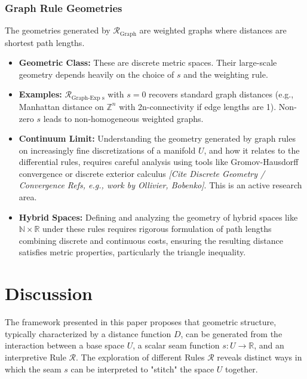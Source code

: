 \documentclass[twoside,twocolumn]{article}
\begin{document}
\subsubsection{Graph Rule Geometries}
The geometries generated by \( \mathcal{R}_{\text{Graph}} \) are weighted graphs where distances are shortest path lengths.
\begin{itemize}
    \item \textbf{Geometric Class:} These are discrete metric spaces. Their large-scale geometry depends heavily on the choice of \( s \) and the weighting rule.
    \item \textbf{Examples:} \( \mathcal{R}_{\text{Graph-Exp s}} \) with \( s=0 \) recovers standard graph distances (e.g., Manhattan distance on \( \mathbb{Z}^n \) with 2n-connectivity if edge lengths are 1). Non-zero \( s \) leads to non-homogeneous weighted graphs.
    \item \textbf{Continuum Limit:} Understanding the geometry generated by graph rules on increasingly fine discretizations of a manifold \( U \), and how it relates to the differential rules, requires careful analysis using tools like Gromov-Hausdorff convergence or discrete exterior calculus \textit{[Cite Discrete Geometry / Convergence Refs, e.g., work by Ollivier, Bobenko]}. This is an active research area.
    \item \textbf{Hybrid Spaces:} Defining and analyzing the geometry of hybrid spaces like \( \mathbb{N} \times \mathbb{R} \) under these rules requires rigorous formulation of path lengths combining discrete and continuous costs, ensuring the resulting distance satisfies metric properties, particularly the triangle inequality.
\end{itemize}


\setcounter{equation}{0}
\section{Discussion}

The framework presented in this paper proposes that geometric structure, typically characterized by a distance function $D$, can be generated from the interaction between a base space $U$, a scalar seam function $s: U \to \mathbb{R}$, and an interpretive Rule $\mathcal{R}$. The exploration of different Rules $\mathcal{R}$ reveals distinct ways in which the seam $s$ can be interpreted to "stitch" the space $U$ together.
\end{document}
